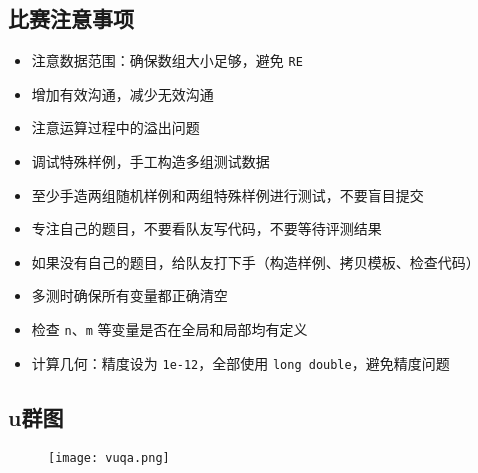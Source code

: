\documentclass[a4paper, fontset=none]{ctexart}
\begin{document}
\subsection{比赛注意事项}

\begin{itemize}
\item 注意数据范围：确保数组大小足够，避免 \texttt{RE}
\item 增加有效沟通，减少无效沟通
\item 注意运算过程中的溢出问题
\item 调试特殊样例，手工构造多组测试数据
\item 至少手造两组随机样例和两组特殊样例进行测试，不要盲目提交
\item 专注自己的题目，不要看队友写代码，不要等待评测结果
\item 如果没有自己的题目，给队友打下手（构造样例、拷贝模板、检查代码）
\item 多测时确保所有变量都正确清空
\item 检查 \texttt{n}、\texttt{m} 等变量是否在全局和局部均有定义
\item 计算几何：精度设为 \texttt{1e-12}，全部使用 \texttt{long double}，避免精度问题
\end{itemize}



\subsection{u群图}
\begin{figure}[h]
\centering
\texttt{[image: vuqa.png]}
\end{figure}
\end{document}
